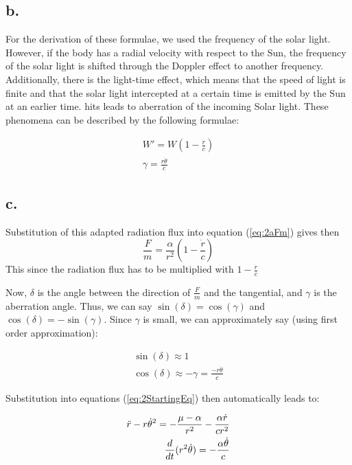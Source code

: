 \subsection*{b.}
For the derivation of these formulae, we used the frequency of the solar light. However, if the body has a radial velocity with respect to the Sun, the frequency of the solar light is shifted through the Doppler effect to another frequency.
Additionally, there is the light-time effect, which means that the speed of light is finite and that the solar light intercepted at a certain time is emitted by the Sun at an earlier time. hits leads to aberration of the incoming Solar light. These phenomena can be described by the following formulae:

\begin{equation}
    \begin{split}
        W' = W(1-\frac{\dot{r}}{c}) \\
        \gamma = \frac{r \dot{\theta}}{c}
    \end{split}
\end{equation}

\subsection*{c.}
Substitution of this adapted radiation flux into equation (\ref{eq:2aFm}) gives then 
\begin{equation}
    \frac{F}{m} = \frac{\alpha}{r^2}(1-\frac{\dot{r}}{c})
\end{equation}
This since the radiation flux has to be multiplied with $1-\frac{\dot{r}}{c}$


Now, $\delta$ is the angle between the direction of $\frac{F}{m}$ and the tangential, and $\gamma$ is the aberration angle. Thus, we can say $\sin{(\delta)} = \cos{(\gamma)}$ and $\cos{(\delta)} = -\sin{(\gamma)}$. Since $\gamma$ is small, we can approximately say (using first order approximation):

\begin{equation}
    \begin{split}
        \sin{(\delta)} \approx 1 \\
        \cos{(\delta)} \approx -\gamma = \frac{- r \dot{\theta}}{c}
    \end{split}
\end{equation}

Substitution into equations (\ref{eq:2StartingEq}) then automatically leads to:

\begin{equation}
    \begin{split}
        \Ddot{r} - r \dot{\theta}^2 = - \frac{\mu - \alpha}{r^2} - \frac{\alpha \dot{r}}{c r^2} \\
        \frac{d}{dt}(r^2 \dot{\theta}) = - \frac{\alpha \dot{\theta}}{c}
    \end{split}
\end{equation}

